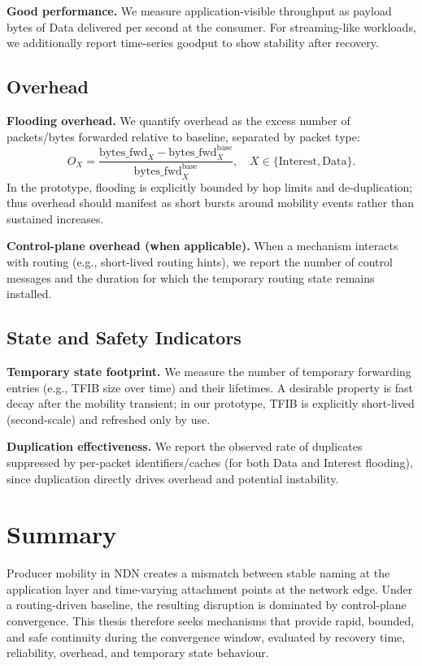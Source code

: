 \textbf{Good performance.}
We measure application-visible throughput as payload bytes of Data delivered per second at the consumer. For streaming-like workloads, we additionally report time-series goodput to show stability after recovery.

\subsection{Overhead}
\label{sec:problem:metrics:overhead}

\textbf{Flooding overhead.}
We quantify overhead as the excess number of packets/bytes forwarded relative to baseline, separated by packet type:
\begin{equation}
  O_X = \frac{\mathrm{bytes\_fwd}_X - \mathrm{bytes\_fwd}^{\mathrm{base}}_X}{\mathrm{bytes\_fwd}^{\mathrm{base}}_X}, \quad X \in \{\mathrm{Interest},\mathrm{Data}\}.
\end{equation}
In the prototype, flooding is explicitly bounded by hop limits and de-duplication; thus overhead should manifest as short bursts around mobility events rather than sustained increases. 

\textbf{Control-plane overhead (when applicable).}
When a mechanism interacts with routing (e.g., short-lived routing hints), we report the number of control messages and the duration for which the temporary routing state remains installed.

\subsection{State and Safety Indicators}
\label{sec:problem:metrics:state_and_safety_indicators}

\textbf{Temporary state footprint.} We measure the number of temporary forwarding entries (e.g., TFIB size over time) and their lifetimes. A desirable property is fast decay after the mobility transient; in our prototype, TFIB is explicitly short-lived (second-scale) and refreshed only by use. 

\textbf{Duplication effectiveness.} We report the observed rate of duplicates suppressed by per-packet identifiers/caches (for both Data and Interest flooding), since duplication directly drives overhead and potential instability. 


\section{Summary}
\label{sec:problem:summary}

Producer mobility in NDN creates a mismatch between stable naming at the application layer and time-varying attachment points at the network edge. Under a routing-driven baseline, the resulting disruption is dominated by control-plane convergence. This thesis therefore seeks mechanisms that provide rapid, bounded, and safe continuity during the convergence window, evaluated by recovery time, reliability, overhead, and temporary state behaviour.
